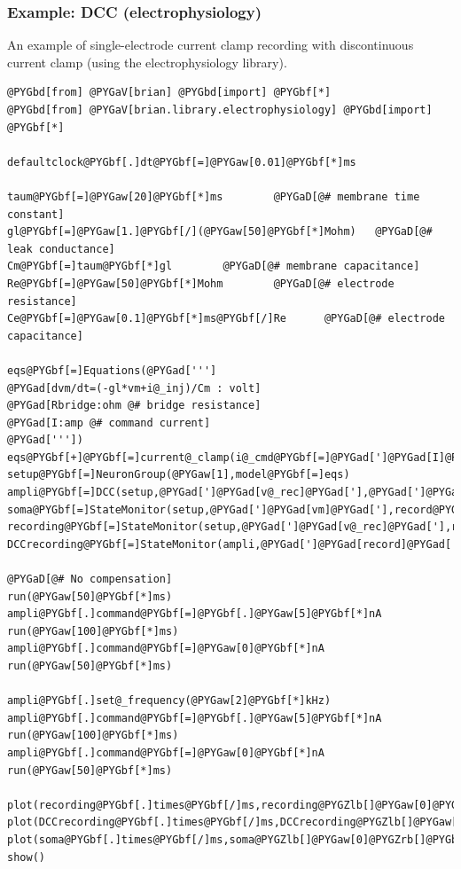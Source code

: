 \documentclass[letterpaper,10pt,english]{manual}
\begin{document}
\resetcurrentobjects
\hypertarget{--doc-examples-electrophysiology_DCC}{}

\hypertarget{index-36}{}\subsubsection{Example: DCC (electrophysiology)}

An example of single-electrode current clamp recording
with discontinuous current clamp (using the electrophysiology library).

\begin{Verbatim}[commandchars=@\[\]]
@PYGbd[from] @PYGaV[brian] @PYGbd[import] @PYGbf[*]
@PYGbd[from] @PYGaV[brian.library.electrophysiology] @PYGbd[import] @PYGbf[*]

defaultclock@PYGbf[.]dt@PYGbf[=]@PYGaw[0.01]@PYGbf[*]ms

taum@PYGbf[=]@PYGaw[20]@PYGbf[*]ms        @PYGaD[@# membrane time constant]
gl@PYGbf[=]@PYGaw[1.]@PYGbf[/](@PYGaw[50]@PYGbf[*]Mohm)   @PYGaD[@# leak conductance]
Cm@PYGbf[=]taum@PYGbf[*]gl        @PYGaD[@# membrane capacitance]
Re@PYGbf[=]@PYGaw[50]@PYGbf[*]Mohm        @PYGaD[@# electrode resistance]
Ce@PYGbf[=]@PYGaw[0.1]@PYGbf[*]ms@PYGbf[/]Re      @PYGaD[@# electrode capacitance]

eqs@PYGbf[=]Equations(@PYGad[''']
@PYGad[dvm/dt=(-gl*vm+i@_inj)/Cm : volt]
@PYGad[Rbridge:ohm @# bridge resistance]
@PYGad[I:amp @# command current]
@PYGad['''])
eqs@PYGbf[+]@PYGbf[=]current@_clamp(i@_cmd@PYGbf[=]@PYGad[']@PYGad[I]@PYGad['],Re@PYGbf[=]Re,Ce@PYGbf[=]Ce)
setup@PYGbf[=]NeuronGroup(@PYGaw[1],model@PYGbf[=]eqs)
ampli@PYGbf[=]DCC(setup,@PYGad[']@PYGad[v@_rec]@PYGad['],@PYGad[']@PYGad[I]@PYGad['],@PYGaw[1]@PYGbf[*]kHz)
soma@PYGbf[=]StateMonitor(setup,@PYGad[']@PYGad[vm]@PYGad['],record@PYGbf[=]@PYGaA[True])
recording@PYGbf[=]StateMonitor(setup,@PYGad[']@PYGad[v@_rec]@PYGad['],record@PYGbf[=]@PYGaA[True])
DCCrecording@PYGbf[=]StateMonitor(ampli,@PYGad[']@PYGad[record]@PYGad['],record@PYGbf[=]@PYGaA[True])

@PYGaD[@# No compensation]
run(@PYGaw[50]@PYGbf[*]ms)
ampli@PYGbf[.]command@PYGbf[=]@PYGbf[.]@PYGaw[5]@PYGbf[*]nA
run(@PYGaw[100]@PYGbf[*]ms)
ampli@PYGbf[.]command@PYGbf[=]@PYGaw[0]@PYGbf[*]nA
run(@PYGaw[50]@PYGbf[*]ms)

ampli@PYGbf[.]set@_frequency(@PYGaw[2]@PYGbf[*]kHz)
ampli@PYGbf[.]command@PYGbf[=]@PYGbf[.]@PYGaw[5]@PYGbf[*]nA
run(@PYGaw[100]@PYGbf[*]ms)
ampli@PYGbf[.]command@PYGbf[=]@PYGaw[0]@PYGbf[*]nA
run(@PYGaw[50]@PYGbf[*]ms)

plot(recording@PYGbf[.]times@PYGbf[/]ms,recording@PYGZlb[]@PYGaw[0]@PYGZrb[]@PYGbf[/]mV,@PYGad[']@PYGad[b]@PYGad['])
plot(DCCrecording@PYGbf[.]times@PYGbf[/]ms,DCCrecording@PYGZlb[]@PYGaw[0]@PYGZrb[]@PYGbf[/]mV,@PYGad[']@PYGad[k]@PYGad['])
plot(soma@PYGbf[.]times@PYGbf[/]ms,soma@PYGZlb[]@PYGaw[0]@PYGZrb[]@PYGbf[/]mV,@PYGad[']@PYGad[r]@PYGad['])
show()
\end{Verbatim}
\end{document}
